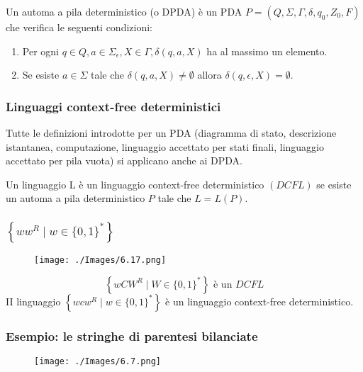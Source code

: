 Un automa a pila deterministico (o DPDA) è un PDA $P=\left(Q, \Sigma, \Gamma, \delta, q_{0}, Z_{0}, F\right)$ che verifica le seguenti condizioni:
\begin{enumerate}
    \item Per ogni $q \in Q, a \in \Sigma_{\epsilon}, X \in \Gamma, \delta(q, a, X)$ ha al massimo un elemento.
    \item Se esiste $a \in \Sigma$ tale che $\delta(q, a, X) \neq \emptyset$ allora $\delta(q, \epsilon, X)=\emptyset$.
\end{enumerate}

\subsubsection{Linguaggi context-free deterministici}

Tutte le definizioni introdotte per un PDA (diagramma di stato, descrizione istantanea, computazione, linguaggio accettato per stati finali, linguaggio accettato per pila vuota) si applicano anche ai DPDA.

\vspace{5mm}


Un linguaggio L è un linguaggio context-free deterministico $(D C F L)$ se esiste un automa a pila deterministico $P$ tale che $L=L(P) .$


\subsubsection{$\left\{w w^{R} \mid w \in\{0,1\}^{*}\right\}$}

\begin{figure}[hbpt!]
    \centering
    \texttt{[image: ./Images/6.17.png]}
\end{figure}
\FloatBarrier

$$
\left\{w C W^{R} \mid W \in\{0,1\}^{*}\right\} \text { è un } D C F L
$$
II linguaggio $\left\{w c w^{R} \mid w \in\{0,1\}^{*}\right\}$ è un linguaggio context-free deterministico.

\subsubsection{Esempio:
le stringhe di parentesi bilanciate}

\begin{figure}[hbpt!]
    \centering
    \texttt{[image: ./Images/6.7.png]}
\end{figure}
\FloatBarrier

